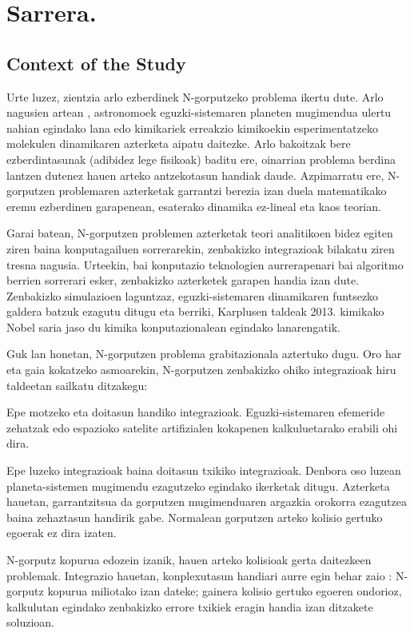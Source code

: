 \chapter{Sarrera.}


\section{Context of the Study}

Urte luzez, zientzia arlo ezberdinek N-gorputzeko problema ikertu dute. Arlo nagusien artean , astronomoek eguzki-sistemaren planeten mugimendua ulertu nahian egindako lana edo kimikariek erreakzio kimikoekin esperimentatzeko molekulen dinamikaren azterketa aipatu daitezke. Arlo bakoitzak bere ezberdintasunak (adibidez lege fisikoak) baditu ere, oinarrian problema berdina lantzen dutenez hauen arteko antzekotasun handiak daude. Azpimarratu ere,  N-gorputzen problemaren azterketak garrantzi berezia izan duela matematikako eremu ezberdinen garapenean, esaterako dinamika ez-lineal eta kaos teorian. 

Garai batean, N-gorputzen problemen azterketak teori analitikoen bidez egiten ziren baina konputagailuen sorrerarekin, zenbakizko integrazioak bilakatu ziren tresna nagusia. Urteekin, bai konputazio teknologien aurrerapenari bai algoritmo berrien sorrerari esker, zenbakizko azterketek garapen handia izan dute. Zenbakizko simulazioen laguntzaz, eguzki-sistemaren dinamikaren funtsezko galdera batzuk ezagutu ditugu eta berriki, Karplusen taldeak 2013. kimikako Nobel saria \cite{Karplus2014} jaso du kimika konputazionalean egindako lanarengatik.       

Guk lan honetan, N-gorputzen problema grabitazionala aztertuko dugu. Oro har eta gaia kokatzeko asmoarekin, N-gorputzen zenbakizko ohiko integrazioak hiru taldeetan sailkatu ditzakegu:
\begin{enumerate}
{
\item Epe motzeko eta doitasun handiko integrazioak. 
 Eguzki-sistemaren efemeride zehatzak edo espazioko satelite artifizialen kokapenen kalkuluetarako erabili ohi dira.
\item Epe luzeko integrazioak baina doitasun txikiko integrazioak.
 Denbora oso luzean planeta-sistemen mugimendu ezagutzeko egindako ikerketak ditugu. Azterketa hauetan, garrantzitsua da gorputzen mugimenduaren  argazkia orokorra ezagutzea baina zehaztasun handirik gabe. Normalean gorputzen arteko kolisio gertuko egoerak ez dira izaten.     
\item N-gorputz kopurua edozein izanik, hauen arteko kolisioak gerta daitezkeen problemak.
 Integrazio hauetan, konplexutasun handiari aurre egin behar zaio : N-gorputz kopurua miliotako izan dateke; gainera kolisio gertuko egoeren ondorioz, kalkulutan egindako zenbakizko errore txikiek eragin handia izan ditzakete soluzioan.
    
}
\end{enumerate}

